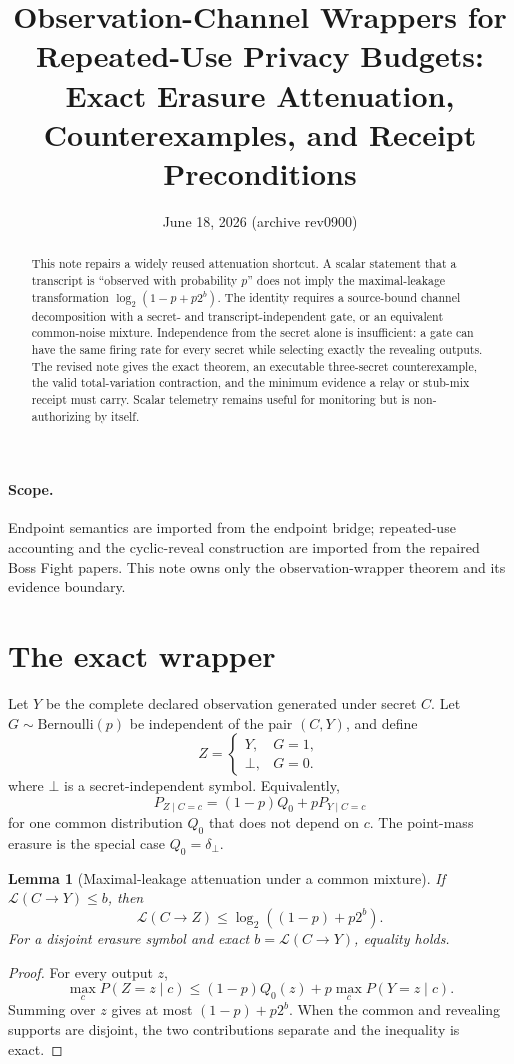 \documentclass[11pt]{article}
\title{Observation-Channel Wrappers for Repeated-Use Privacy Budgets:\\
\large Exact Erasure Attenuation, Counterexamples, and Receipt Preconditions}
\author{}
\date{June 18, 2026 (archive rev0900)}
\newtheorem{lemma}{Lemma}
\theoremstyle{definition}
\newcommand{\MaxL}{\mathcal{L}}
\begin{document}
\maketitle

\begin{abstract}
This note repairs a widely reused attenuation shortcut. A scalar statement that a transcript is ``observed with probability \(p\)'' does not imply the maximal-leakage transformation \(\log_2(1-p+p2^b)\). The identity requires a source-bound channel decomposition with a secret- and transcript-independent gate, or an equivalent common-noise mixture. Independence from the secret alone is insufficient: a gate can have the same firing rate for every secret while selecting exactly the revealing outputs. The revised note gives the exact theorem, an executable three-secret counterexample, the valid total-variation contraction, and the minimum evidence a relay or stub-mix receipt must carry. Scalar telemetry remains useful for monitoring but is non-authorizing by itself.
\end{abstract}

\paragraph{Scope.}
Endpoint semantics are imported from the endpoint bridge; repeated-use accounting and the cyclic-reveal construction are imported from the repaired Boss Fight papers. This note owns only the observation-wrapper theorem and its evidence boundary.\cite{series:endpointbridge,series:bossfightB}

\section{The exact wrapper}\label{sec:wrapper}
Let \(Y\) be the complete declared observation generated under secret \(C\). Let \(G\sim\mathrm{Bernoulli}(p)\) be independent of the pair \((C,Y)\), and define
\[
Z=\begin{cases}Y,&G=1,\\ \bot,&G=0.\end{cases}
\]
where \(\bot\) is a secret-independent symbol. Equivalently,
\[
P_{Z\mid C=c}=(1-p)Q_0+pP_{Y\mid C=c}
\]
for one common distribution \(Q_0\) that does not depend on \(c\). The point-mass erasure is the special case \(Q_0=\delta_\bot\).

\begin{lemma}[Maximal-leakage attenuation under a common mixture]\label{lem:thin-maxl}
If \(\MaxL(C\to Y)\le b\), then
\[
\MaxL(C\to Z)\le \log_2\!\left((1-p)+p2^b\right).
\]
For a disjoint erasure symbol and exact \(b=\MaxL(C\to Y)\), equality holds.
\end{lemma}
\begin{proof}
For every output \(z\),
\[
\max_c P(Z=z\mid c)
\le (1-p)Q_0(z)+p\max_cP(Y=z\mid c).
\]
Summing over \(z\) gives at most \((1-p)+p2^b\). When the common and revealing supports are disjoint, the two contributions separate and the inequality is exact.
\end{proof}
\end{document}
